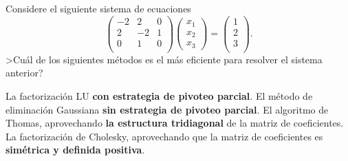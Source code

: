 \begin{pregunta}
\begin{cuerpo}
Considere el siguiente sistema de ecuaciones
$$
\left(\begin{array}{rrr}
-2&2&0\\
2&-2&1\\
0&1&0\\
\end{array}\right)
\left(\begin{array}{r}
x_1\\
x_2\\
x_3
\end{array}\right)
=
\left(\begin{array}{r}
1\\
2\\
3\\
\end{array}\right).
$$
>Cu\'al de los siguientes m\'etodos es el m\'as eficiente para resolver el sistema anterior?
\end{cuerpo}
\begin{alternativas}
{La factorizaci\'on LU \textbf{con estrategia de pivoteo parcial}.}
{El m\'etodo de eliminaci\'on Gaussiana \textbf{sin estrategia de pivoteo parcial}.}
{El algoritmo de Thomas, aprovechando \textbf{la estructura tridiagonal} de la matriz de coeficientes.}
{La factorizaci\'on de Cholesky, aprovechando que la matriz de coeficientes es \textbf{sim\'etrica y definida positiva}.}
\end{alternativas}
\justificacion{0cm}
\end{pregunta}